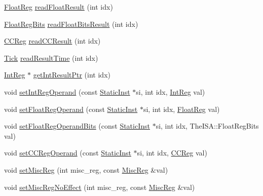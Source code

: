 \begin{DoxyCompactItemize}
\item 
\hyperlink{classInOrderDynInst_a75484259f1855aabc8d74c6eb1cfe186}{FloatReg} \hyperlink{classInOrderDynInst_a69fdad14fd08c464a87e7d8f878eea27}{readFloatResult} (int idx)
\item 
\hyperlink{classInOrderDynInst_aab5eeae86499f9bfe15ef79360eccc64}{FloatRegBits} \hyperlink{classInOrderDynInst_ae67b5a7b277039c37357545993f190f5}{readFloatBitsResult} (int idx)
\item 
\hyperlink{classInOrderDynInst_a0c9de550a32808e6a25b54b6c791d5ab}{CCReg} \hyperlink{classInOrderDynInst_ab7e58b49a7e5605cecb289947ed601d9}{readCCResult} (int idx)
\item 
\hyperlink{base_2types_8hh_a5c8ed81b7d238c9083e1037ba6d61643}{Tick} \hyperlink{classInOrderDynInst_a171a5ef54c4a5e79154c185e58615e27}{readResultTime} (int idx)
\item 
\hyperlink{classInOrderDynInst_a1355cb78d031430d4d70eb5080267604}{IntReg} $\ast$ \hyperlink{classInOrderDynInst_a087e654b0d51abe5fc757e98027789bc}{getIntResultPtr} (int idx)
\item 
void \hyperlink{classInOrderDynInst_a2261caa4a6bc09599abc8950215d2e97}{setIntRegOperand} (const \hyperlink{classStaticInst}{StaticInst} $\ast$si, int idx, \hyperlink{classInOrderDynInst_a1355cb78d031430d4d70eb5080267604}{IntReg} val)
\item 
void \hyperlink{classInOrderDynInst_addc8b4b6511725bf8ff48bd09ef22892}{setFloatRegOperand} (const \hyperlink{classStaticInst}{StaticInst} $\ast$si, int idx, \hyperlink{classInOrderDynInst_a75484259f1855aabc8d74c6eb1cfe186}{FloatReg} val)
\item 
void \hyperlink{classInOrderDynInst_a724fbca03bfcb160789e0458751994d5}{setFloatRegOperandBits} (const \hyperlink{classStaticInst}{StaticInst} $\ast$si, int idx, TheISA::FloatRegBits val)
\item 
void \hyperlink{classInOrderDynInst_a859133f9c66c7b72cb02ff58e8385b52}{setCCRegOperand} (const \hyperlink{classStaticInst}{StaticInst} $\ast$si, int idx, \hyperlink{classInOrderDynInst_a0c9de550a32808e6a25b54b6c791d5ab}{CCReg} val)
\item 
void \hyperlink{classInOrderDynInst_a1877dde4f3eb17a8b7d33ea40176c148}{setMiscReg} (int misc\_\-reg, const \hyperlink{classInOrderDynInst_aaf5f073a387db0556d1db4bcc45428bc}{MiscReg} \&val)
\item 
void \hyperlink{classInOrderDynInst_a763517aaea2f3decbc1ef9d064216b6f}{setMiscRegNoEffect} (int misc\_\-reg, const \hyperlink{classInOrderDynInst_aaf5f073a387db0556d1db4bcc45428bc}{MiscReg} \&val)

\end{DoxyCompactItemize}
